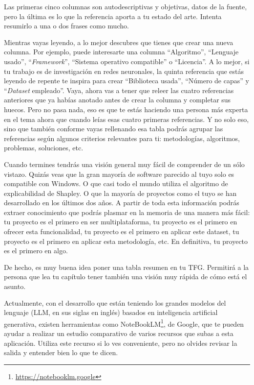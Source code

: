 Las primeras cinco columnas son autodescriptivas y objetivas, datos de la fuente, pero la última es lo que la referencia aporta a tu estado del arte. Intenta resumirlo a una o dos frases como mucho.

Mientras vayas leyendo, a lo mejor descubres que tienes que crear una nueva columna. Por ejemplo, puede interesarte una columna ``Algoritmo'', ``Lenguaje usado'', ``\textit{Framework}'', ``Sistema operativo compatible'' o ``Licencia''. A lo mejor, si tu trabajo es de investigación en redes neuronales, la quinta referencia que estás leyendo de repente te inspira para crear ``Biblioteca usada'', ``Número de capas'' y ``\textit{Dataset} empleado''. Vaya, ahora vas a tener que releer las cuatro referencias anteriores que ya habías anotado antes de crear la columna y completar sus huecos. Pero no pasa nada, eso es que te estás haciendo una persona más experta en el tema ahora que cuando leías esas cuatro primeras referencias. Y no solo eso, sino que también conforme vayas rellenando esa tabla podrás agrupar las referencias según algunos criterios relevantes para ti: metodologías, algoritmos, problemas, soluciones, etc.

Cuando termines tendrás una visión general muy fácil de comprender de un sólo vistazo. Quizás veas que la gran mayoría de software parecido al tuyo solo es compatible con Windows. O que casi todo el mundo utiliza el algoritmo de explicabilidad de Shapley. O que la mayoría de proyectos como el tuyo se han desarrollado en los últimos dos años. A partir de toda esta información podrás extraer conocimiento que podrás plasmar en la memoria de una manera más fácil: tu proyecto es el primero en ser multiplataforma, tu proyecto es el primero en ofrecer esta funcionalidad, tu proyecto es el primero en aplicar este dataset, tu proyecto es el primero en aplicar esta metodología, etc. En definitiva, tu proyecto es el primero en algo.

De hecho, es muy buena idea poner una tabla resumen en tu TFG. Permitirá a la persona que lea tu capítulo tener también una visión muy rápida de cómo está el asunto.

Actualmente, con el desarrollo que están teniendo los grandes modelos del lenguaje (LLM, en sus siglas en inglés) basados en inteligencia artificial generativa, existen herramientas como {NoteBookLM}\footnote{\url{https://notebooklm.google}}, de Google, que te pueden ayudar a realizar un estudio comparativo de varios recursos que subas a esta aplicación. Utiliza este recurso si lo ves conveniente, pero no olvides revisar la salida y entender bien lo que te dicen.

